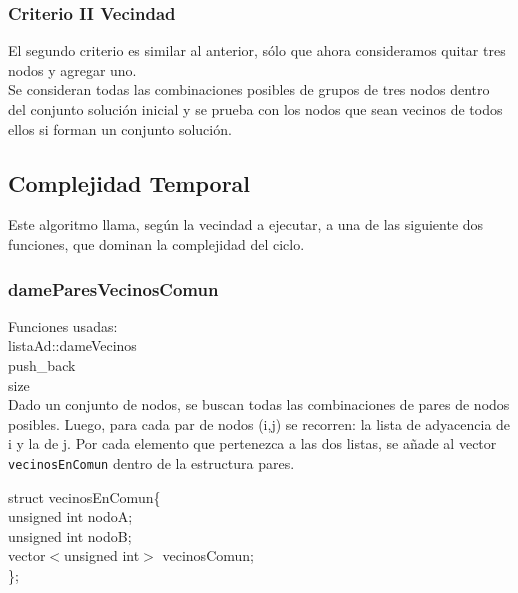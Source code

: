 \subsubsection*{Criterio II Vecindad}

El segundo criterio es similar al anterior, s\'olo que ahora consideramos quitar tres nodos y agregar uno.\\

Se consideran todas las combinaciones posibles de grupos de tres nodos dentro del conjunto soluci\'on inicial y se prueba con los nodos que sean vecinos de todos ellos si forman un conjunto soluci\'on.\\

\newpage
\subsection{Complejidad Temporal}
Este algoritmo llama, seg\'un la vecindad a ejecutar, a una de las siguiente dos funciones, que dominan la complejidad del ciclo.

\subsubsection{dameParesVecinosComun}\label{vec1}

Funciones usadas:\\
listaAd::dameVecinos\\
push_back\\
size\\

Dado un conjunto de nodos, se buscan todas las combinaciones de pares de nodos posibles. 
Luego, para cada par de nodos (i,j) se recorren: la lista de adyacencia de i y la de j. 
Por cada elemento que pertenezca a las dos listas, se a\~nade al vector \texttt{vecinosEnComun} dentro de la estructura pares.

\begin{algorithm}[h!]
struct vecinosEnComun\{\\
	unsigned int nodoA;\\	
	unsigned int nodoB;\\
	vector$<$unsigned int$>$ vecinosComun;\\
\};
\end{algorithm}

